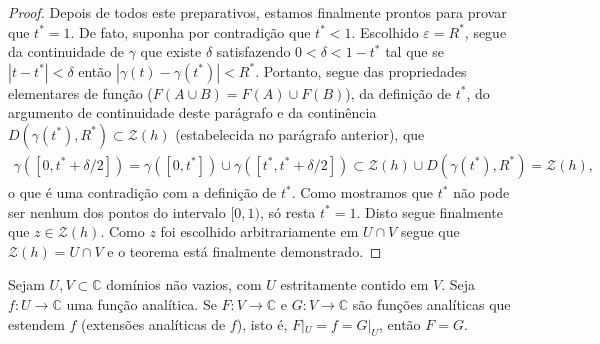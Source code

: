 \begin{proof}
\medskip 


Depois de todos este preparativos, estamos finalmente prontos para provar que $t^{*}=1$.
De fato, suponha por contradição que $t^{*}<1$. 
Escolhido $\varepsilon = R^{*}$, segue da continuidade de $\gamma$ que 
existe $\delta$ satisfazendo $0<\delta<1-t^{*}$ tal que se $|t-t^{*}|<\delta$ então 
$|\gamma(t)-\gamma(t^{*})|<R^{*}$. Portanto, segue das propriedades
elementares de função ($F(A\cup B)=F(A)\cup F(B)$), da definição de $t^{*}$, 
do argumento de continuidade deste parágrafo e da continência 
$D(\gamma(t^*),R^{*})\subset\mathcal{Z}(h)$
(estabelecida no parágrafo anterior), que 
\begin{align*}
\gamma([0,t^{*}+\delta/2])
=
\gamma([0,t^{*}])\cup \gamma([t^{*},t^{*}+\delta/2])
\subset \mathcal{Z}(h)\cup D(\gamma(t^*),R^{*})
=
\mathcal{Z}(h),
\end{align*}
o que é uma contradição com a definição de $t^{*}$. Como mostramos que $t^{*}$ não pode ser nenhum dos pontos do intervalo $[0,1)$, só resta $t^{*}=1$. Disto segue 
finalmente que $z\in \mathcal{Z}(h)$. Como $z$ foi 
escolhido arbitrariamente em $U\cap V$ segue que $\mathcal{Z}(h)=U\cap V$
e o teorema está finalmente demonstrado.
\end{proof}





\begin{corolario}
\label{cor-unicidade-ext-analiticas}
Sejam $U,V\subset \mathbb{C}$ domínios não vazios, com $U$ estritamente contido em $V$. 
Seja $f:U\to\mathbb{C}$ uma função analítica. Se $F:V\to\mathbb{C}$
e $G:V\to\mathbb{C}$ são funções analíticas que estendem $f$ (extensões
analíticas de $f$), isto é, $F|_{U}=f=G|_{U}$, então $F=G$. 
\end{corolario}


